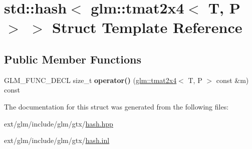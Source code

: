 \hypertarget{structstd_1_1hash_3_01glm_1_1tmat2x4_3_01_t_00_01_p_01_4_01_4}{\section{std\-:\-:hash$<$ glm\-:\-:tmat2x4$<$ T, P $>$ $>$ Struct Template Reference}
\label{structstd_1_1hash_3_01glm_1_1tmat2x4_3_01_t_00_01_p_01_4_01_4}
}
\subsection*{Public Member Functions}
\begin{DoxyCompactItemize}
\item 
\hypertarget{structstd_1_1hash_3_01glm_1_1tmat2x4_3_01_t_00_01_p_01_4_01_4_af0ad74bfd9c05453592c47d35139527e}{G\-L\-M\-\_\-\-F\-U\-N\-C\-\_\-\-D\-E\-C\-L size\-\_\-t {\bfseries operator()} (\hyperlink{structglm_1_1tmat2x4}{glm\-::tmat2x4}$<$ T, P $>$ const \&m) const }\label{structstd_1_1hash_3_01glm_1_1tmat2x4_3_01_t_00_01_p_01_4_01_4_af0ad74bfd9c05453592c47d35139527e}

\end{DoxyCompactItemize}


The documentation for this struct was generated from the following files\-:\begin{DoxyCompactItemize}
\item 
ext/glm/include/glm/gtx/\hyperlink{hash_8hpp}{hash.\-hpp}\item 
ext/glm/include/glm/gtx/\hyperlink{hash_8inl}{hash.\-inl}\end{DoxyCompactItemize}
